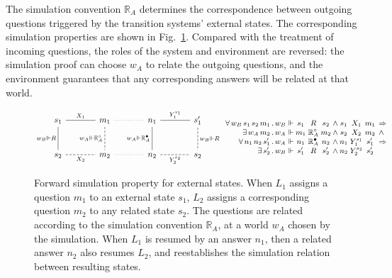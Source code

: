 \documentclass[11pt,oneside,draft]{book}
\theoremstyle{definition}
\newcommand{\que}{\circ}         %
\newcommand{\ans}{\bullet}       %
\begin{document}
The simulation convention $\mathbb{R}_A$
determines the correspondence between
outgoing questions triggered by
the transition systems' external states.
The corresponding simulation properties
are shown in Fig.~\ref{fig:fsim-ext}.
Compared with the treatment of incoming questions,
the roles of the system and environment are reversed:
the simulation proof can choose $w_A$
to relate the outgoing questions,
and the environment guarantees that any corresponding answers
will be related at that world.

\begin{figure} %
  \[
      \begin{tikzcd}[sep=large,baseline=-3pt]
        s_1 \ar[r, "X_1", dash] \ar[d, "w_B \Vdash R"', dash] &
        m_1 \ar[r, dotted, dash] \ar[d, "w_A \Vdash \mathbb{R}_A^\que"', dash, dashed] &
        n_1 \ar[r, "Y_1^{s_1}", dash] \ar[d, "w_A \Vdash \mathbb{R}_A^\ans"', dash] &
        s_1' \ar[d, "w_B \Vdash R", dash, dashed]
        \\
        s_2 \ar[r, "X_2"', dash, dashed] &
        m_2 \ar[r, dotted, dash] &
        n_2 \ar[r, "Y_2^{s_2}"', dash, dashed] &
        s_2
      \end{tikzcd}
      \small
      \begin{array}{
          r @{\,.\,} l @{{} \Vdash {}} c@{}c@{}c @{\:\wedge\:}
                                    c@{}c@{}c @{\:\:} l}
        \forall \, w_B \, s_1 \, s_2 \, m_1 & w_B & s_1 & {}\mathrel{R}{} & s_2 &
                        s_1 & {}\mathrel{X_1}{} & m_1 & \Rightarrow \\
        \exists \, w_A \, m_2 & w_A & m_1 & {}\mathrel{\mathbb{R}_A^\que}{} & m_2 &
                        s_2 & {}\mathrel{X_2}{} & m_2 & \wedge \\
        \forall \, n_1 \, n_2 \, s_1' & w_A & n_1 & {}\mathrel{\mathbb{R}_A^\ans}{} & n_2 &
                        n_1 & {}\mathrel{Y_1^{s_1}}{} & s_1' & \Rightarrow \\
        \exists \, s_2' & w_B & s_1' & {}\mathrel{R}{} & s_2' &
                        n_2 & {}\mathrel{Y_2^{s_2}}{} & s_2' &
      \end{array}
  \]
  \caption[Forward simulation properties (cont.)]%
   {Forward simulation property for external states.
    When $L_1$ assigns a question $m_1$ to an external state $s_1$,
    $L_2$ assigns a corresponding question $m_2$ to any related state $s_2$.
    The questions are related according to
    the simulation convention $\mathbb{R}_A$,
    at a world $w_A$ chosen by the simulation.
    When $L_1$ is resumed by an answer $n_1$,
    then a related answer $n_2$ also resumes $L_2$,
    and reestablishes the simulation relation
    between resulting states.}
  \label{fig:fsim-ext}
\end{figure}
\end{document}
